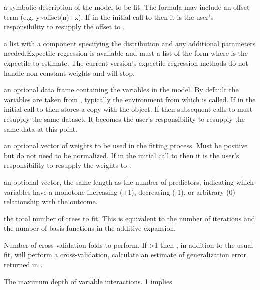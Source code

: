\documentclass[a4paper]{book}
\begin{document}
\begin{Arguments}
\begin{ldescription}
\item[\code{formula}] a symbolic description of the model to be fit. The formula may 
include an offset term (e.g. y\textasciitilde{}offset(n)+x). If  in 
the initial call to  then it is the user's responsibility to 
resupply the offset to .
\item[\code{distribution}] a list with a component  specifying the distribution 
and any additional parameters needed.Expectile regression is available and  must a list of the form 
 where  is the expectile 
to estimate. The current version's expectile regression methods do 
not handle non-constant weights and will stop.
\item[\code{data}] an optional data frame containing the variables in the model. By
default the variables are taken from , typically 
the environment from which  is called. If  in 
the initial call to  then  stores a copy with the 
object. If  then subsequent calls to 
 must resupply the same dataset. It becomes the user's 
responsibility to resupply the same data at this point.
\item[\code{weights}] an optional vector of weights to be used in the fitting process. 
Must be positive but do not need to be normalized. If  
in the initial call to  then it is the user's responsibility to 
resupply the weights to .
\item[\code{var.monotone}] an optional vector, the same length as the number of
predictors, indicating which variables have a monotone increasing (+1),
decreasing (-1), or arbitrary (0) relationship with the outcome.
\item[\code{n.trees}] the total number of trees to fit. This is equivalent to the
number of iterations and the number of basis functions in the additive
expansion.
\item[\code{cv.folds}] Number of cross-validation folds to perform. If >1 then
, in addition to the usual fit, will perform a cross-validation, calculate
an estimate of generalization error returned in .
\item[\code{interaction.depth}] The maximum depth of variable interactions. 1 implies

\end{ldescription}
\end{Arguments}
\end{document}
